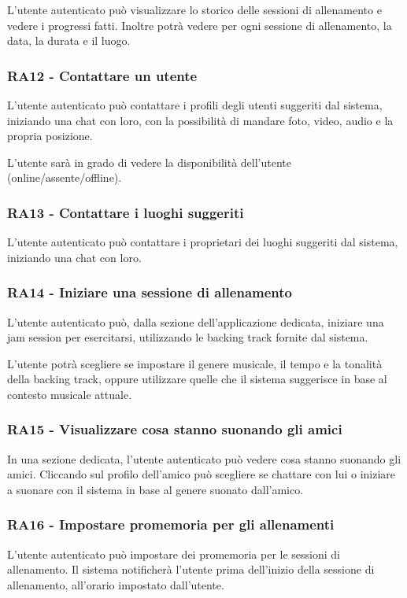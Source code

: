 \documentclass[12pt, a4paper]{article}
\begin{document}
L'utente autenticato può visualizzare lo storico delle sessioni di allenamento e vedere i progressi fatti. Inoltre potrà vedere per ogni sessione di allenamento, la data, la durata e il luogo.

\subsubsection*{\hypertarget{RA12}{RA12 - Contattare un utente}}

L'utente autenticato può contattare i profili degli utenti suggeriti dal sistema, iniziando una chat con loro, con la possibilità di mandare foto, video, audio e la propria posizione.

L'utente sarà in grado di vedere la disponibilità dell'utente (online/assente/offline).


\subsubsection*{\hypertarget{RA13}{RA13 - Contattare i luoghi suggeriti}}

L'utente autenticato può contattare i proprietari dei luoghi suggeriti dal sistema, iniziando una chat con loro.

\subsubsection*{\hypertarget{RA14}{RA14 - Iniziare una sessione di allenamento}}

L'utente autenticato può, dalla sezione dell'applicazione dedicata, iniziare una jam session per esercitarsi, utilizzando le backing track fornite dal sistema.

L'utente potrà scegliere se impostare il genere musicale, il tempo e la tonalità della backing track, oppure utilizzare quelle che il sistema suggerisce in base al contesto musicale attuale.


\subsubsection*{\hypertarget{RA15}{RA15 - Visualizzare cosa stanno suonando gli amici}}

In una sezione dedicata, l'utente autenticato può vedere cosa stanno suonando gli amici. Cliccando sul profilo dell'amico può scegliere se chattare con lui o iniziare a suonare con il sistema in base al genere suonato dall'amico.

\subsubsection*{\hypertarget{RA16}{RA16 - Impostare promemoria per gli allenamenti}} L'utente autenticato può impostare dei promemoria per le sessioni di allenamento. Il sistema notificherà l'utente prima dell'inizio della sessione di allenamento, all'orario impostato dall'utente.
\end{document}
